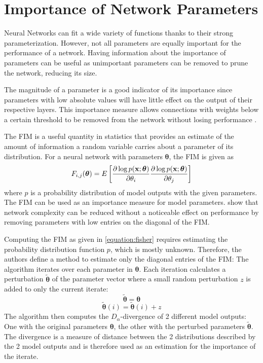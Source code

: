 
\section{Importance of Network Parameters} \label{section:fisher}
Neural Networks can fit a wide variety of functions 
thanks to their strong parameterization. However, 
not all parameters are equally important for 
the performance of a network. Having information
about the importance of parameters can be useful as
unimportant parameters can be removed to prune
the network, reducing its size. 

The magnitude of a
parameter is a good indicator of its importance since
parameters with low absolute values will have little 
effect on the output of their respective layers. 
This importance measure allows
connections with weights below a certain threshold 
to be removed from the network without losing 
performance \parencite{weight-pruning}.

The \ac{FIM} is a useful quantity in statistics that 
provides an estimate of the amount of information a random
variable carries about a parameter of its distribution.
For a neural network with parameters $\bm{\theta}$,
the \ac{FIM} is given as
\begin{equation}\label{equation:fisher}
    F_{i,j}(\bm{\theta}) = E\left[\pdv{\log p(\mathbf{x}; \bm{\theta})}{\theta_i} \pdv{\log p(\mathbf{x}; \bm{\theta})}{\theta_j}\right]
\end{equation}
where $p$ is a probability distribution of model
outputs with the given parameters. The \ac{FIM} 
can be used as an importance measure for model parameters.
\textcite{fisher-reduction} show 
that network complexity can be reduced
without a noticeable effect on performance by removing 
parameters with low entries on the diagonal of
the \ac{FIM}.

Computing the \ac{FIM} as given in \autoref{equation:fisher}
requires estimating the probability distribution function
$p$, which is mostly unknown. 
Therefore, the authors define a method to estimate 
only the diagonal entries of the \ac{FIM}: 
The algorithm iterates over each parameter in $\bm{\theta}$.
Each iteration calculates a perturbation 
$\tilde{\bm{\theta}}$ of the parameter vector where a small 
random perturbation $z$ is added to only the current iterate:
\begin{equation*}
    \tilde{\bm{\theta}} = \bm{\theta} 
\end{equation*}
\begin{equation}
    \tilde{\bm{\theta}}(i) = \tilde{\bm{\theta}}(i) + z
\end{equation}
The algorithm then computes the $D_\alpha$-divergence of 
2 different model outputs: One with the original parameters 
$\bm{\theta}$, the other with the 
perturbed parameters $\tilde{\bm{\theta}}$. 
The divergence is a measure of distance between the 2
distributions described by the 2 model outputs and is 
therefore used as an estimation for the importance of
the iterate. 

